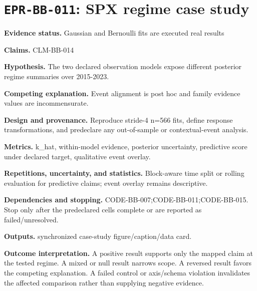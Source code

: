 \section[\texttt{EPR-BB-011}]{\texttt{EPR-BB-011}: SPX regime case study}
\textbf{Evidence status.} Gaussian and Bernoulli fits are executed real results\par
\textbf{Claims.} CLM-BB-014\par
\textbf{Hypothesis.} The two declared observation models expose different posterior regime summaries over 2015-2023.\par
\textbf{Competing explanation.} Event alignment is post hoc and family evidence values are incommensurate.\par
\textbf{Design and provenance.} Reproduce stride-4 n=566 fits, define response transformations, and predeclare any out-of-sample or contextual-event analysis.\par
\textbf{Metrics.} k\_hat, within-model evidence, posterior uncertainty, predictive score under declared target, qualitative event overlay.\par
\textbf{Repetitions, uncertainty, and statistics.} Block-aware time split or rolling evaluation for predictive claims; event overlay remains descriptive.\par
\textbf{Dependencies and stopping.} CODE-BB-007;CODE-BB-011;CODE-BB-015. Stop only after the predeclared cells complete or are reported as failed/unresolved.\par
\textbf{Outputs.} synchronized case-study figure/caption/data card.\par
\textbf{Outcome interpretation.} A positive result supports only the mapped claim at the tested regime. A mixed or null result narrows scope. A reversed result favors the competing explanation. A failed control or axis/schema violation invalidates the affected comparison rather than supplying negative evidence.

